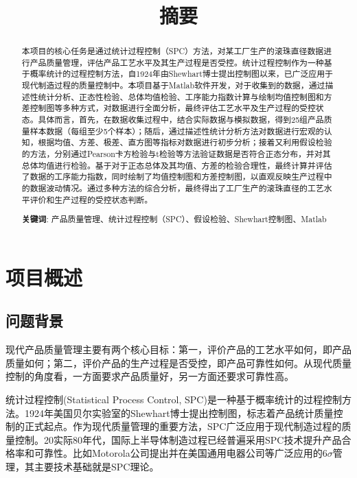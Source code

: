 \documentclass[12pt]{article}  %
\title{摘要}
\begin{document}
\begin{abstract}
	\vspace{15pt}
	本项目的核心任务是通过统计过程控制（SPC）方法，对某工厂生产的滚珠直径数据进行产品质量管理，评估产品工艺水平及其生产过程是否受控。统计过程控制作为一种基于概率统计的过程控制方法，自1924年由Shewhart博士提出控制图以来，已广泛应用于现代制造过程的质量控制中。本项目基于Matlab软件开发，对于收集到的数据，通过描述性统计分析、正态性检验、总体均值检验、工序能力指数计算与绘制均值控制图和方差控制图等多种方式，对数据进行全面分析，最终评估工艺水平及生产过程的受控状态。具体而言，首先，在数据收集过程中，结合实际数据与模拟数据，得到25组产品质量样本数据（每组至少5个样本）；随后，通过描述性统计分析方法对数据进行宏观的认知，根据均值、方差、极差、直方图等指标对数据进行初步分析；接着又利用假设检验的方法，分别通过Pearson卡方检验与t检验等方法验证数据是否符合正态分布，并对其总体均值进行检验。基于对于正态总体及其均值、方差的检验合理性，最终计算并评估了数据的工序能力指数，同时绘制了均值控制图和方差控制图，以直观反映生产过程中的数据波动情况。通过多种方法的综合分析，最终得出了工厂生产的滚珠直径的工艺水平评价和生产过程的受控状态判断。
	\vspace{5pt}
	\noindent
	
	\textbf{关键词}: 产品质量管理、统计过程控制（SPC）、假设检验、Shewhart控制图、Matlab
\end{abstract}

\maketitle  

\tableofcontents

\section{项目概述}

\subsection{问题背景}
现代产品质量管理主要有两个核心目标：第一，评价产品的工艺水平如何，即产品质量如何；第二，评价产品的生产过程是否受控，即产品可靠性如何。从现代质量控制的角度看，一方面要求产品质量好，另一方面还要求可靠性高。	

统计过程控制(Statistical Process Control, SPC)是一种基于概率统计的过程控制方法。1924年美国贝尔实验室的Shewhart博士提出控制图，标志着产品统计质量控制的正式起点。作为现代质量管理的重要方法，SPC广泛应用于现代制造过程的质量控制。20实际80年代，国际上半导体制造过程已经普遍采用SPC技术提升产品合格率和可靠性。比如Motorola公司提出并在美国通用电器公司等广泛应用的$6\sigma$管理，其主要技术基础就是SPC理论。	
\end{document}
